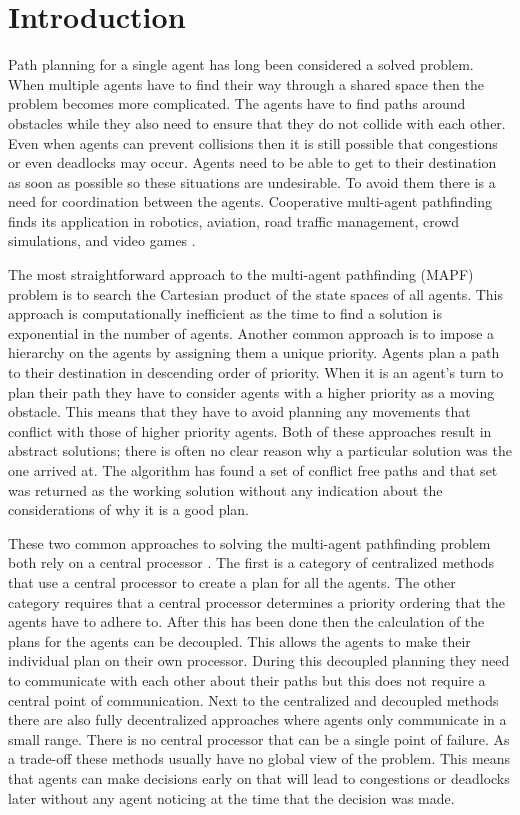 \section{Introduction}\label{sec:intro}
Path planning for a single agent has long been considered a solved problem.
When multiple agents have to find their way through a shared space then the
problem becomes more complicated. The agents have to find paths around
obstacles while they also need to ensure that they do not collide with each
other. Even when agents can prevent collisions then it is still possible that
congestions or even deadlocks may occur. Agents need to be able to get to their
destination as soon as possible so these situations are undesirable. To avoid
them there is a need for coordination between the agents. Cooperative
multi-agent pathfinding finds its application in robotics, aviation, road
traffic management, crowd simulations, and video games \cite{standley2011}.

The most straightforward approach to the multi-agent pathfinding (MAPF) problem
is to search the Cartesian product of the state spaces of all agents. This
approach is computationally inefficient \cite{sharon2013} as the time to find a
solution is exponential in the number of agents. Another common approach is to
impose a hierarchy on the agents by assigning them a unique priority. Agents
plan a path to their destination in descending order of priority. When it is an
agent's turn to plan their path they have to consider agents with a higher
priority as a moving obstacle. This means that they have to avoid planning any
movements that conflict with those of higher priority agents. Both of these
approaches result in abstract solutions; there is often no clear reason why a
particular solution was the one arrived at. The algorithm has found a set of
conflict free paths and that set was returned as the working solution without
any indication about the considerations of why it is a good plan.

These two common approaches to solving the multi-agent pathfinding problem both
rely on a central processor \cite{chouhan2017}. The first is a category of
centralized methods that use a central processor to create a plan for all the
agents. The other category requires that a central processor determines a
priority ordering that the agents have to adhere to. After this has been done
then the calculation of the plans for the agents can be decoupled. This allows
the agents to make their individual plan on their own processor. During this
decoupled planning they need to communicate with each other about their paths
but this does not require a central point of communication. Next to the
centralized and decoupled methods there are also fully decentralized approaches
where agents only communicate in a small range. There is no central processor
that can be a single point of failure. As a trade-off these methods usually
have no global view of the problem. This means that agents can make decisions
early on that will lead to congestions or deadlocks later without any agent
noticing at the time that the decision was made.

